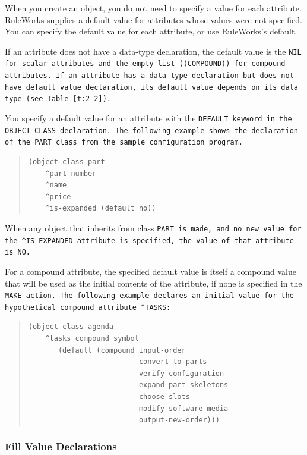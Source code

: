 When you create an object, you do not need to specify a value
for each attribute. RuleWorks supplies a default value for
attributes whose values were not specified. You can specify
the default value for each attribute, or use RuleWorks's
default.

If an attribute does not have a data-type declaration, the default
value is the \tt{NIL} for scalar attributes and the empty list
(\tt{(COMPOUND)}) for compound attributes. If an attribute has a data
type declaration but does not have default value declaration, its
default value depends on its data type (see Table~\ref{t:2-2}).

You specify a default value for an attribute with the \tt{DEFAULT}
keyword in the \tt{OBJECT-CLASS} declaration. The following
example shows the declaration of the \tt{PART} class from the
sample configuration program.

\begin{quote}
\begin{verbatim}
(object-class part
    ^part-number
    ^name
    ^price 
    ^is-expanded (default no))
\end{verbatim}
\end{quote}

When any object that inherits from class \tt{PART} is made, and no
new value for the \verb|^IS-EXPANDED| attribute is specified, the
value of that attribute is \tt{NO}.

For a compound attribute, the specified default value is
itself a compound value that will be used as the initial
contents of the attribute, if none is specified in the \tt{MAKE}
action. The following example declares an initial value for
the hypothetical compound attribute \verb|^TASKS|:

\begin{quote}
\begin{verbatim}
(object-class agenda
    ^tasks compound symbol
       (default (compound input-order
                          convert-to-parts
                          verify-configuration
                          expand-part-skeletons
                          choose-slots
                          modify-software-media
                          output-new-order)))
\end{verbatim}
\end{quote}

\subsubsection{Fill Value Declarations}


